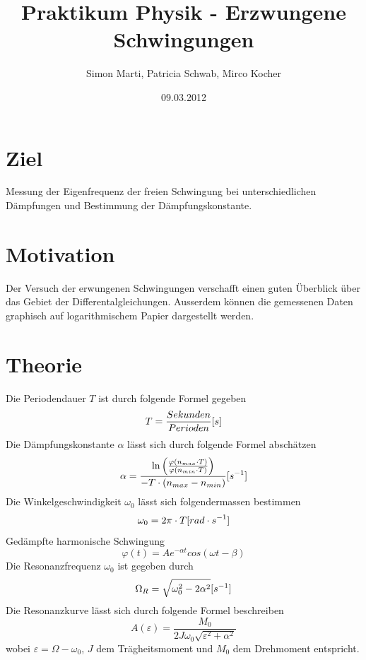 \documentclass[12pt,a4paper]{article}
\title{Praktikum Physik - Erzwungene Schwingungen}
\author{Simon Marti, Patricia Schwab, Mirco Kocher}
\date{09.03.2012}
\begin{document}
\maketitle

\section*{Ziel}
Messung der Eigenfrequenz der freien Schwingung bei unterschiedlichen D\"ampfungen und Bestimmung der D\"ampfungskonstante.

\section*{Motivation}
Der Versuch der erwungenen Schwingungen verschafft einen guten \"Uberblick \"uber das Gebiet der Differentalgleichungen. Ausserdem k\"onnen die gemessenen Daten graphisch auf logarithmischem Papier dargestellt werden. 

\section*{Theorie}
Die Periodendauer $T$ ist durch folgende Formel gegeben
\begin{equation}
T = \frac{Sekunden}{Perioden} \mbox [{s}]
\end{equation}
Die D\"ampfungskonstante $\alpha$ l\"asst sich durch folgende Formel absch\"atzen
\begin{equation}
\alpha = \frac{\ln\left( \frac{\varphi(n_{max} \cdot T)}{\varphi(n_{min} \cdot T)}\right)}{-T\cdot (n_{max} - n_{min})} \mbox [{s}^{-1}]
\end{equation}
Die Winkelgeschwindigkeit $\omega_0$ l\"asst sich folgendermassen bestimmen
\begin{equation}
\omega_0 = 2\pi \cdot T \mbox[{rad \cdot s}^{-1}]
\end{equation}
Ged\"ampfte harmonische Schwingung
\begin{equation}\label{eq:phi}
\varphi(t) = Ae^{-\alpha t}cos(\omega t - \beta)
\end{equation}
Die Resonanzfrequenz $\omega_0$ ist gegeben durch
\begin{equation}
\Omega_R = \sqrt{\omega_0^2 - 2\alpha^2} \mbox [{s}^{-1}]
\end{equation}
Die Resonanzkurve l\"asst sich durch folgende Formel beschreiben
\begin{equation}
A(\varepsilon) = \frac{M_0}{2J\omega_0\sqrt{\varepsilon^2 + \alpha^2}}
\end{equation}
wobei $\varepsilon = \Omega - \omega_0$, $J$ dem Tr\"agheitsmoment und $M_0$ dem Drehmoment entspricht.
\end{document}
